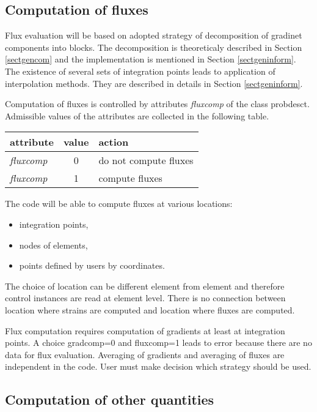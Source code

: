 \subsection{Computation of fluxes}
\label{sectfluxcomp}

Flux evaluation will be based on adopted strategy of decomposition of gradinet components
into blocks. The decomposition is theoreticaly described in Section \ref{sectgencom} and the
implementation is mentioned in Section \ref{sectgeninform}. The existence of several sets of
integration points leads to application of interpolation methods. They are described in details
in Section \ref{sectgeninform}.

Computation of fluxes is controlled by attributes {\it fluxcomp} of the class
{\sf probdesct}. Admissible values of the attributes are collected in the following table.


\begin{center}
\begin{tabular}{|l|c|l|}
\hline
attribute & value & action
\\ \hline \hline
{\it fluxcomp} & 0 & do not compute fluxes
\\ \hline
{\it fluxcomp} & 1 & compute fluxes
\\ \hline
\end{tabular}
\end{center}

The code will be able to compute fluxes at various locations:
\begin{itemize}
\item{integration points,}
\item{nodes of elements,}
\item{points defined by users by coordinates.}
\end{itemize}
The choice of location can be different element from element and therefore control instances are read
at element level. There is no connection between location where strains are computed and
location where fluxes are computed.

Flux computation requires computation of gradients at least at integration points.
A choice gradcomp=0 and fluxcomp=1 leads
to error because there are no data for flux evaluation. Averaging of gradients and averaging of fluxes
are independent in the code. User must make decision which strategy should be used.

\subsection{Computation of other quantities}
\label{sectothercomp}

